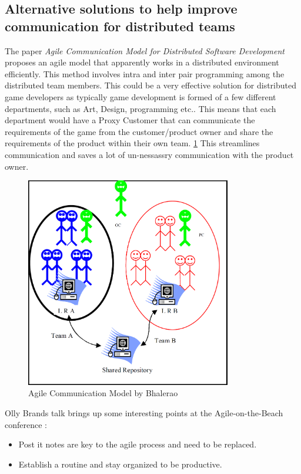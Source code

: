 \documentclass{scrartcl}
\begin{document}
\subsection{Alternative solutions to help improve communication for distributed teams}


The paper \textit{Agile Communication Model for Distributed Software Development} \cite{bhalerao2010} proposes an agile model that apparently works in a distributed environment efficiently. This method involves intra and inter pair programming among the distributed team members. 
This could be a very effective solution for distributed game developers as typically game development is formed of a few different departments, such as Art, Design, programming etc.. This means that each department would have a Proxy Customer that can communicate the requirements of the game from the customer/product owner and share the requirements of the product within their own team. \ref{fig:ACM} This streamlines communication and saves a lot of un-nessassry communication with the product owner.

\begin{figure}[p]
    \centering
    \includegraphics[width=0.8\textwidth]{ACMDSD}
    \caption{Agile Communication Model by Bhalerao\cite{bhalerao2010}}
    \label{fig:ACM}
\end{figure}


Olly Brands talk brings up some interesting points at the Agile-on-the-Beach conference \cite{OllyBrandLiveBlog2015}:

\begin{itemize}
\item Post it notes are key to the agile process and need to be replaced. 
\item Establish a routine and stay organized to be productive. 
\end{itemize}
\end{document}
